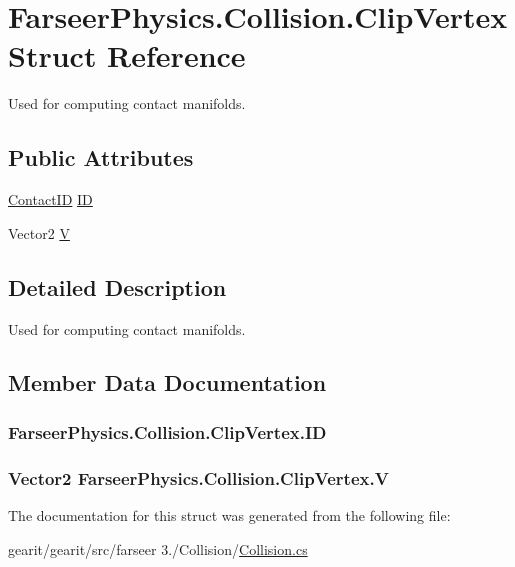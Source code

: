 \hypertarget{struct_farseer_physics_1_1_collision_1_1_clip_vertex}{\section{Farseer\+Physics.\+Collision.\+Clip\+Vertex Struct Reference}
\label{struct_farseer_physics_1_1_collision_1_1_clip_vertex}
}


Used for computing contact manifolds.  


\subsection*{Public Attributes}
\begin{DoxyCompactItemize}
\item 
\hyperlink{struct_farseer_physics_1_1_collision_1_1_contact_i_d}{Contact\+I\+D} \hyperlink{struct_farseer_physics_1_1_collision_1_1_clip_vertex_a72433216fa332f253a20899807eb98ba}{I\+D}
\item 
Vector2 \hyperlink{struct_farseer_physics_1_1_collision_1_1_clip_vertex_a6fde20a805eb00cfe18e9deb9b91cca6}{V}
\end{DoxyCompactItemize}


\subsection{Detailed Description}
Used for computing contact manifolds. 



\subsection{Member Data Documentation}
\hypertarget{struct_farseer_physics_1_1_collision_1_1_clip_vertex_a72433216fa332f253a20899807eb98ba}{
\subsubsection[{I\+D}]{ Farseer\+Physics.\+Collision.\+Clip\+Vertex.\+I\+D}}\label{struct_farseer_physics_1_1_collision_1_1_clip_vertex_a72433216fa332f253a20899807eb98ba}
\hypertarget{struct_farseer_physics_1_1_collision_1_1_clip_vertex_a6fde20a805eb00cfe18e9deb9b91cca6}{
\subsubsection[{V}]{\setlength{\rightskip}{0pt plus 5cm}Vector2 Farseer\+Physics.\+Collision.\+Clip\+Vertex.\+V}}\label{struct_farseer_physics_1_1_collision_1_1_clip_vertex_a6fde20a805eb00cfe18e9deb9b91cca6}


The documentation for this struct was generated from the following file\+:\begin{DoxyCompactItemize}
\item 
gearit/gearit/src/farseer 3./\+Collision/\hyperlink{_collision_8cs}{Collision.\+cs}\end{DoxyCompactItemize}
